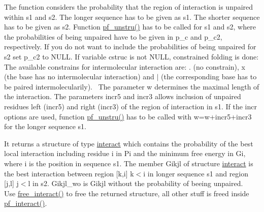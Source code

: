 The function considers the probability that the region of interaction is unpaired within \textquotesingle{}s1\textquotesingle{} and \textquotesingle{}s2\textquotesingle{}. The longer sequence has to be given as \textquotesingle{}s1\textquotesingle{}. The shorter sequence has to be given as \textquotesingle{}s2\textquotesingle{}. Function \hyperlink{group__up__cofold_ga5b4ee40e190d2f633cd01cf0d2fe93cf}{pf\+\_\+unstru()} has to be called for \textquotesingle{}s1\textquotesingle{} and \textquotesingle{}s2\textquotesingle{}, where the probabilities of being unpaired have to be given in \textquotesingle{}p\+\_\+c\textquotesingle{} and \textquotesingle{}p\+\_\+c2\textquotesingle{}, respectively. If you do not want to include the probabilities of being unpaired for \textquotesingle{}s2\textquotesingle{} set \textquotesingle{}p\+\_\+c2\textquotesingle{} to N\+U\+LL. If variable \textquotesingle{}cstruc\textquotesingle{} is not N\+U\+LL, constrained folding is done\+: The available constrains for intermolecular interaction are\+: \textquotesingle{}.\textquotesingle{} (no constrain), \textquotesingle{}x\textquotesingle{} (the base has no intermolecular interaction) and \textquotesingle{}$\vert$\textquotesingle{} (the corresponding base has to be paired intermolecularily).~\newline
The parameter \textquotesingle{}w\textquotesingle{} determines the maximal length of the interaction. The parameters \textquotesingle{}incr5\textquotesingle{} and \textquotesingle{}incr3\textquotesingle{} allows inclusion of unpaired residues left (\textquotesingle{}incr5\textquotesingle{}) and right (\textquotesingle{}incr3\textquotesingle{}) of the region of interaction in \textquotesingle{}s1\textquotesingle{}. If the \textquotesingle{}incr\textquotesingle{} options are used, function \hyperlink{group__up__cofold_ga5b4ee40e190d2f633cd01cf0d2fe93cf}{pf\+\_\+unstru()} has to be called with w=w+incr5+incr3 for the longer sequence \textquotesingle{}s1\textquotesingle{}.

It returns a structure of type \hyperlink{group__data__structures_structinteract}{interact} which contains the probability of the best local interaction including residue i in Pi and the minimum free energy in Gi, where i is the position in sequence \textquotesingle{}s1\textquotesingle{}. The member Gikjl of structure \hyperlink{group__data__structures_structinteract}{interact} is the best interaction between region \mbox{[}k,i\mbox{]} k$<$i in longer sequence \textquotesingle{}s1\textquotesingle{} and region \mbox{[}j,l\mbox{]} j$<$l in \textquotesingle{}s2\textquotesingle{}. Gikjl\+\_\+wo is Gikjl without the probability of beeing unpaired.~\newline
Use \hyperlink{group__up__cofold_gadde308fd5f696dc271b1532aa96fd12f}{free\+\_\+interact()} to free the returned structure, all other stuff is freed inside \hyperlink{group__up__cofold_ga1aa0aa02bc3a724f87360c03097afd00}{pf\+\_\+interact()}.


